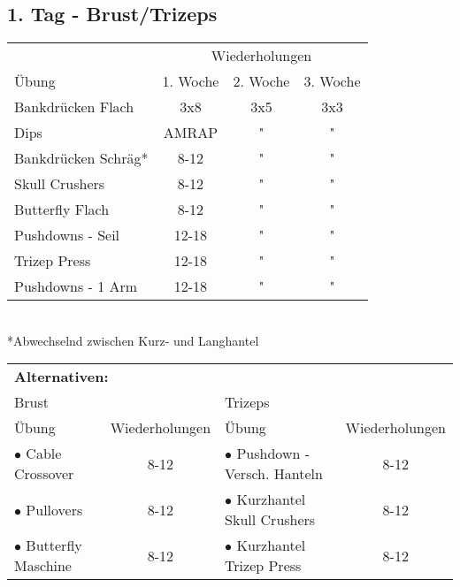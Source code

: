 \documentclass[10pt,a4paper]{article}
\begin{document}
	\subsection{1. Tag - Brust/Trizeps}
		\begin{tabular}{l||c|c|c}
			& \multicolumn{3}{c}{Wiederholungen} \\ 
			Übung & 1. Woche & 2. Woche & 3. Woche \\ 
			\hline
			\hline 
			Bankdrücken Flach & 3x8 & 3x5 & 3x3 \\ 
			\hline 
			Dips & AMRAP & " & " \\
			\hline 
			Bankdrücken Schräg* & 8-12 & " & " \\ 
			\hline 
			Skull Crushers & 8-12 & " & " \\ 
			\hline 
			Butterfly Flach & 8-12 & " & " \\ 
			\hline 
			Pushdowns - Seil & 12-18 & " & " \\ 
			\hline 
			Trizep Press & 12-18 & " & " \\
			\hline 
			Pushdowns - 1 Arm & 12-18 & " & " \\ 
		\end{tabular} \\
	*Abwechselnd zwischen Kurz- und Langhantel
		\vspace{1cm}\\
		\begin{tabular}{lc|lc}
			\multicolumn{4}{l}{\textbf{Alternativen:}}	\\
			\multicolumn{2}{l}{Brust} & \multicolumn{2}{l}{Trizeps} \\ 
			\hline
			\midrule
			Übung	& Wiederholungen	& Übung	& Wiederholungen	\\
			$\bullet$ Cable Crossover	& 8-12	& $\bullet$ Pushdown - Versch. Hanteln	& 8-12	\\
			$\bullet$ Pullovers	& 8-12	& $\bullet$ Kurzhantel Skull Crushers	& 8-12	\\
			$\bullet$ Butterfly Maschine	& 8-12	& $\bullet$ Kurzhantel Trizep Press	& 8-12	\\
		\end{tabular} 
\end{document}

